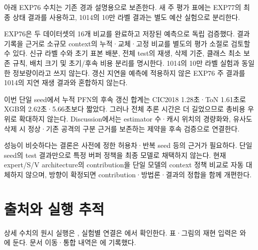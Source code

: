 아래 EXP76 수치는 기존 경과 설명용으로 보존한다. 새 주 평가 표에는 EXP77의 최종 상태 결과를 사용하고, 1014의 10만 라벨 결과는 별도 예산 실험으로 분리한다.

EXP76은 두 데이터셋의 16개 비교를 완료하고 저장된 예측으로 독립 검증했다. 결과 기록을 근거로 소규모 context의 누적·교체·고정 비교를 별도의 평가 소절로 검토할 수 있다. 신규 라벨 수와 초기 표본 배분, 전체 test의 재생, 삭제 기준, 클래스 최소 보존 규칙, 배치 크기 및 초기/\allowbreak{}후속 비용 분리를 명시한다. 1014의 10만 라벨 실험과 동일한 정보량이라고 쓰지 않는다. 갱신 지연을 예측에 적용하지 않은 EXP76 주 결과를 1014의 지연 재생 결과와 혼합하지 않는다.

이번 단일 seed에서 누적 PFN의 후속 갱신 합계는 CIC2018 1.28초·ToN 1.61초로 XGB의 2.62초·5.66초보다 짧았다. 그러나 전체 추론 시간은 더 길었으므로 총비용 우위로 확대하지 않는다. Discussion에서는 estimator 수·캐시 위치의 경량화와, 유사도 삭제 시 정상·기존 공격의 구분 근거를 보존하는 제약을 후속 검증으로 연결한다.

성능이 비슷하다는 결론은 사전에 정한 허용차·반복 seed 등의 근거가 필요하다. 단일 seed의 test 결과만으로 특정 버퍼 정책을 최종 모델로 채택하지 않는다. 현재 expert/\allowbreak{}S/\allowbreak{}V architecture의 contribution을 단일 모델의 context 정책 비교로 자동 대체하지 않으며, 방향이 확정되면 contribution·방법론·결과의 정합을 함께 개편한다.



\section*{출처와 실행 추적}

상세 수치의 원시 실행은 , 실험별 연결은 에서 확인한다. 표·그림의 재현 입력은 와 에 둔다. 문서 이동·통합 내역은 에 기록했다.



